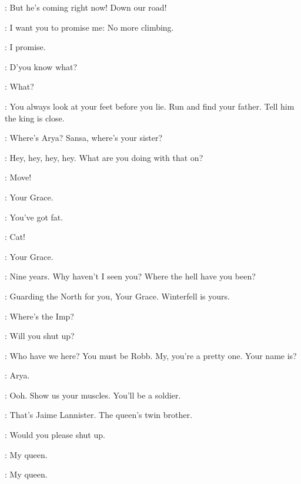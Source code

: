 \BRAN: But he's coming right now! Down our road! 

\CATELYN: I want you to promise me: No more climbing. 

\BRAN: I promise. 

\CATELYN: D'you know what? 

\BRAN: What? 

\CATELYN: You always look at your feet before you lie. Run and find your father. Tell him the king is close. 


\CATELYN: Where's Arya? Sansa, where's your sister? 


\NED: Hey, hey, hey, hey. What are you doing with that on?  

\ARYA:  Move! 


\NED: Your Grace. 

\ROBERT: You've got fat. 


\ROBERT: Cat! 

\CATELYN: Your Grace. 

\ROBERT: Nine years. Why haven't I seen you? Where the hell have you been? 

\NED: Guarding the North for you, Your Grace. Winterfell is yours. 

\ARYA: Where's the Imp? 

\SANSA: Will you shut up? 

\ROBERT: Who have we here? You must be Robb.  My, you're a pretty one.  Your name is? 

\ARYA: Arya. 

\ROBERT:   Ooh. Show us your muscles. You'll be a soldier. 


\ARYA: That's Jaime Lannister. The queen's twin brother. 

\SANSA: Would you please shut up. 


\NED: My queen. 

\CATELYN: My queen. 

